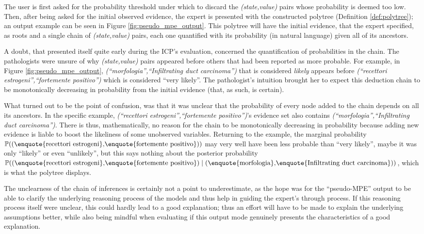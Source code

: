 The user is first asked for the probability threshold under which to discard the \textit{(state,value)} pairs whose probability is deemed too low.
Then, after being asked for the initial observed evidence, the expert is presented with the constructed polytree (Definition \ref{def:polytree}); an output example can be seen in Figure \ref{fig:pseudo_mpe_output}.
This polytree will have the initial evidence, that the expert specified, as roots and a single chain of \textit{(state,value)} pairs, each one quantified with its probability (in natural language) given all of its ancestors.

A doubt, that presented itself quite early during the ICP's evaluation, concerned the quantification of probabilities in the chain.
The pathologists were unsure of why \textit{(state,value)} pairs appeared before others that had been reported as more probable.
For example, in Figure \ref{fig:pseudo_mpe_output}, \textit{(\enquote{morfologia},\enquote{Infiltrating duct carcinoma})} that is considered \textit{likely} appears before \textit{(\enquote{recettori estrogeni},\enquote{fortemente positivo})} which is considered \enquote{very likely}.
The pathologist's intuition brought her to expect this deduction chain to be monotonically decreasing in probability from the initial evidence (that, as such, is certain).

What turned out to be the point of confusion, was that it was unclear that the probability of every node added to the chain depends on all its ancestors.
In the specific example, \textit{(\enquote{recettori estrogeni},\enquote{fortemente positivo})}'s evidence set also contains \textit{(\enquote{morfologia},\enquote{Infiltrating duct carcinoma})}.
There is thus, mathematically, no reason for the chain to be monotonically decreasing in probability because adding new evidence is liable to boost the likeliness of some unobserved variables.
Returning to the example, the marginal probability $\mathbb{P}((\text{\enquote{recettori estrogeni},\enquote{fortemente positivo}}))$ may very well have been less probable than \enquote{very likely}, maybe it was only \enquote{likely} or even \enquote{unlikely}, but this says nothing about the posterior probability $\mathbb{P}((\text{\enquote{recettori estrogeni},\enquote{fortemente positivo}}) \mid (\text{\enquote{morfologia},\enquote{Infiltrating duct carcinoma}}) )$, which is what the polytree displays.

The unclearness of the chain of inferences is certainly not a point to underestimate, as the hope was for the \enquote{pseudo-MPE} output to be able to clarify the underlying reasoning process of the models and thus help in guiding the expert's through process.
If this reasoning process itself were unclear, this could hardly lead to a good explanation; thus an effort will have to be made to explain the underlying assumptions better, while also being mindful when evaluating if this output mode genuinely presents the characteristics of a good explanation.

